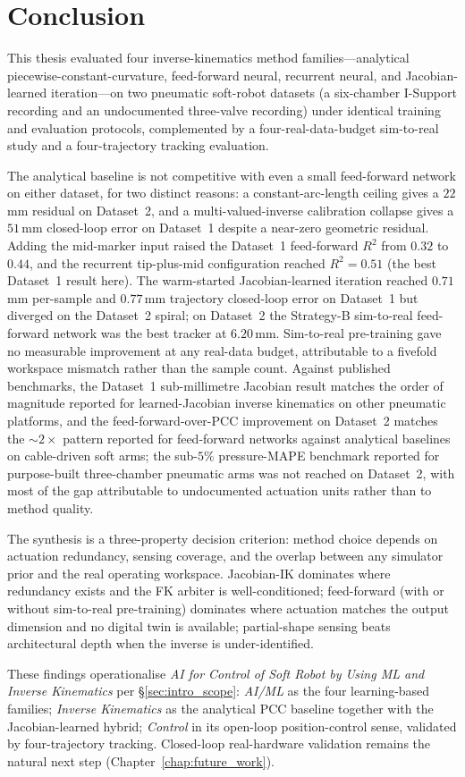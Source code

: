 \chapter{Conclusion}
\label{chap:conclusion}

This thesis evaluated four inverse-kinematics method families---analytical piecewise-constant-curvature, feed-forward neural, recurrent neural, and Jacobian-learned iteration---on two pneumatic soft-robot datasets (a six-chamber I-Support recording and an undocumented three-valve recording) under identical training and evaluation protocols, complemented by a four-real-data-budget sim-to-real study and a four-trajectory tracking evaluation.

The analytical baseline is not competitive with even a small feed-forward network on either dataset, for two distinct reasons: a constant-arc-length ceiling gives a $22$\,mm residual on Dataset~2, and a multi-valued-inverse calibration collapse gives a $51$\,mm closed-loop error on Dataset~1 despite a near-zero geometric residual. Adding the mid-marker input raised the Dataset~1 feed-forward $R^{2}$ from $0.32$ to $0.44$, and the recurrent tip-plus-mid configuration reached $R^{2} = 0.51$ (the best Dataset~1 result here). The warm-started Jacobian-learned iteration reached $0.71$\,mm per-sample and $0.77$\,mm trajectory closed-loop error on Dataset~1 but diverged on the Dataset~2 spiral; on Dataset~2 the Strategy-B sim-to-real feed-forward network was the best tracker at $6.20$\,mm. Sim-to-real pre-training gave no measurable improvement at any real-data budget, attributable to a fivefold workspace mismatch rather than the sample count. Against published benchmarks, the Dataset~1 sub-millimetre Jacobian result matches the order of magnitude reported for learned-Jacobian inverse kinematics on other pneumatic platforms, and the feed-forward-over-PCC improvement on Dataset~2 matches the $\sim$$2\times$ pattern reported for feed-forward networks against analytical baselines on cable-driven soft arms; the sub-$5\%$ pressure-MAPE benchmark reported for purpose-built three-chamber pneumatic arms was not reached on Dataset~2, with most of the gap attributable to undocumented actuation units rather than to method quality.

The synthesis is a three-property decision criterion: method choice depends on actuation redundancy, sensing coverage, and the overlap between any simulator prior and the real operating workspace. Jacobian-IK dominates where redundancy exists and the FK arbiter is well-conditioned; feed-forward (with or without sim-to-real pre-training) dominates where actuation matches the output dimension and no digital twin is available; partial-shape sensing beats architectural depth when the inverse is under-identified.

These findings operationalise \emph{AI for Control of Soft Robot by Using ML and Inverse Kinematics} per §\ref{sec:intro_scope}: \emph{AI/ML} as the four learning-based families; \emph{Inverse Kinematics} as the analytical PCC baseline together with the Jacobian-learned hybrid; \emph{Control} in its open-loop position-control sense, validated by four-trajectory tracking. Closed-loop real-hardware validation remains the natural next step (Chapter~\ref{chap:future_work}).
